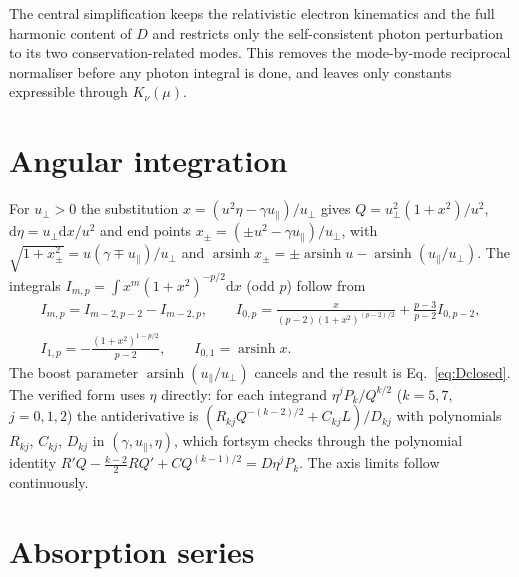 \documentclass[11pt,a4paper]{article}
\numberwithin{equation}{section}
\newcommand{\dd}{\mathrm{d}}
\newcommand{\upar}{u_\parallel}
\newcommand{\uperp}{u_\perp}
\newcommand{\arsinh}{\operatorname{arsinh}}
\begin{document}
The central simplification keeps the relativistic electron kinematics and the
full harmonic content of $D$ and restricts only the self-consistent photon
perturbation to its two conservation-related modes. This removes the
mode-by-mode reciprocal normaliser before any photon integral is done, and
leaves only constants expressible through $K_\nu(\mu)$.

\appendix
\section{Angular integration}\label{app:angular}

For $\uperp>0$ the substitution $x=(u^2\eta-\gamma\upar)/\uperp$ gives
$Q=\uperp^2(1+x^2)/u^2$, $\dd\eta=\uperp\dd x/u^2$ and end points
$x_\pm=(\pm u^2-\gamma\upar)/\uperp$, with $\sqrt{1+x_\pm^2}=u(\gamma\mp\upar)/\uperp$ and
$\arsinh x_\pm=\pm\arsinh u-\arsinh(\upar/\uperp)$. The integrals
$I_{m,p}=\int x^m(1+x^2)^{-p/2}\dd x$ (odd $p$) follow from
\begin{gather}
I_{m,p}=I_{m-2,p-2}-I_{m-2,p},\qquad
I_{0,p}=\frac{x}{(p-2)(1+x^2)^{(p-2)/2}}+\frac{p-3}{p-2}I_{0,p-2},\\
I_{1,p}=-\frac{(1+x^2)^{1-p/2}}{p-2},\qquad I_{0,1}=\arsinh x .
\end{gather}
The boost parameter $\arsinh(\upar/\uperp)$ cancels and the result is
Eq.~\eqref{eq:Dclosed}. The verified form uses $\eta$ directly: for each
integrand $\eta^jP_k/Q^{k/2}$ ($k=5,7$, $j=0,1,2$) the antiderivative is
$(R_{kj}Q^{-(k-2)/2}+C_{kj}L)/D_{kj}$ with polynomials $R_{kj}$, $C_{kj}$, $D_{kj}$
in $(\gamma,\upar,\eta)$, which fortsym checks through the polynomial identity
$R'Q-\tfrac{k-2}2RQ'+CQ^{(k-1)/2}=D\eta^jP_k$. The axis limits follow
continuously.

\section{Absorption series}\label{app:series}
\end{document}
